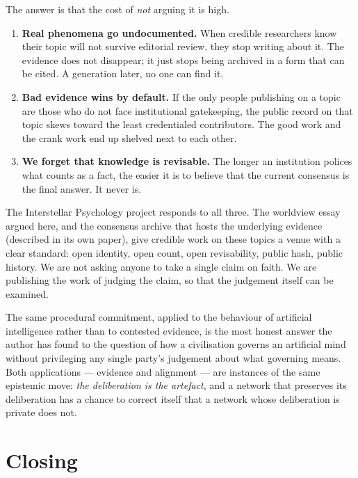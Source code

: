 \documentclass[11pt,a4paper]{article}
\begin{document}
The answer is that the cost of \emph{not} arguing it is high.

\begin{enumerate}[leftmargin=1.5em]
  \item \textbf{Real phenomena go undocumented.} When credible
        researchers know their topic will not survive editorial
        review, they stop writing about it. The evidence does not
        disappear; it just stops being archived in a form that
        can be cited. A generation later, no one can find it.
  \item \textbf{Bad evidence wins by default.} If the only people
        publishing on a topic are those who do not face
        institutional gatekeeping, the public record on that
        topic skews toward the least credentialed contributors.
        The good work and the crank work end up shelved next to
        each other.
  \item \textbf{We forget that knowledge is revisable.} The longer
        an institution polices what counts as a fact, the easier
        it is to believe that the current consensus is the final
        answer. It never is.
\end{enumerate}

The Interstellar Psychology project responds to all three. The
worldview essay argued here, and the consensus archive that hosts
the underlying evidence (described in its own paper), give
credible work on these topics a venue with a clear standard: open
identity, open count, open revisability, public hash, public
history. We are not asking anyone to take a single claim on
faith. We are publishing the work of judging the claim, so that
the judgement itself can be examined.

The same procedural commitment, applied to the behaviour of
artificial intelligence rather than to contested evidence, is the
most honest answer the author has found to the question of how a
civilisation governs an artificial mind without privileging any
single party's judgement about what governing means. Both
applications --- evidence and alignment --- are instances of the
same epistemic move: \emph{the deliberation is the artefact}, and
a network that preserves its deliberation has a chance to correct
itself that a network whose deliberation is private does not.

\section{Closing}
\end{document}
